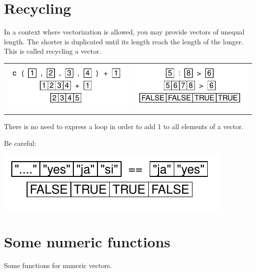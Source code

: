 \documentclass[pdflatex]{article}
\begin{document}
\section{Recycling}

In a context where vectorization is allowed, you may provide vectors of unequal length. The shorter is duplicated until its length reach the length of the longer. This is called recycling a vector.

\begin{tabular}{cc}
\includegraphics{operator_add} & \includegraphics{operator_gt}\\
\end{tabular}

There is no need to express a loop in order to add 1 to all elements of a
vector.

Be careful:

\includegraphics{operator_recycling}

\section{Some numeric functions}

Some functions for numeric vectors.
\end{document}
